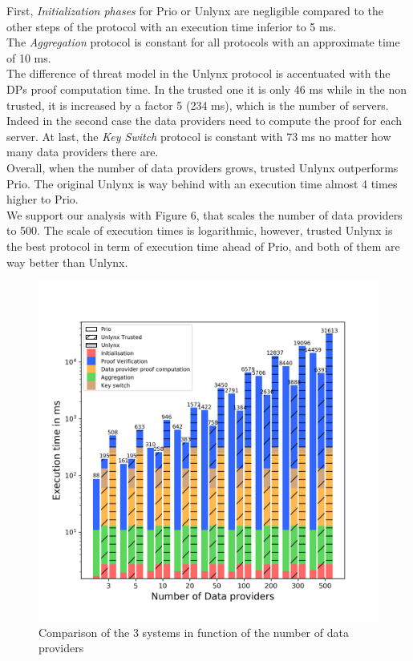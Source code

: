 \documentclass{article}
\begin{document}
First, \textit{Initialization phases} for Prio or Unlynx are negligible compared to the other steps of the protocol with an execution time inferior to 5 ms.\\
The \textit{Aggregation} protocol is constant for all protocols with an approximate time of 10 ms.\\
The difference of threat model in the Unlynx protocol is accentuated with the DPs proof computation time. In the trusted one it is only 46 ms while in the non trusted, it is increased by a factor 5 (234 ms), which is the number of servers.\\
Indeed in the second case the data providers need to compute the proof for each server.
At last, the \textit{Key Switch} protocol is constant with 73 ms no matter how many data providers there are.\\

Overall, when the number of data providers grows, trusted Unlynx outperforms Prio. The original Unlynx is way behind with an execution time almost 4 times higher to Prio.\\
We support our analysis with Figure 6, that scales the number of data providers to 500. The scale of execution times is logarithmic, however, trusted Unlynx is the best protocol in term of execution time ahead of Prio, and both of them are way better than Unlynx.

\begin{figure}[H]
\centering
\includegraphics[scale=0.7]{img/ComparisonDP.png}
\caption{Comparison of the 3 systems in function of the number of data providers}
\end{figure}
 
\end{document}
